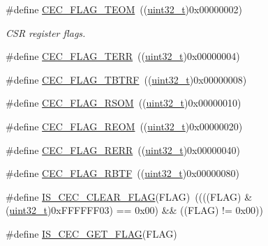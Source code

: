 \begin{DoxyCompactItemize}
\item 
\#define \hyperlink{group___c_e_c__flags__definition_gad0adfb11294f562f2c8dc555f69e25e0}{C\+E\+C\+\_\+\+F\+L\+A\+G\+\_\+\+T\+E\+OM}~((\hyperlink{_p_e___types_8h_a33594304e786b158f3fb30289278f5af}{uint32\+\_\+t})0x00000002)
\begin{DoxyCompactList}\small\item\em C\+SR register flags. \end{DoxyCompactList}\item 
\#define \hyperlink{group___c_e_c__flags__definition_ga7edc608ca7b4ea74dd4d795fa3214c11}{C\+E\+C\+\_\+\+F\+L\+A\+G\+\_\+\+T\+E\+RR}~((\hyperlink{_p_e___types_8h_a33594304e786b158f3fb30289278f5af}{uint32\+\_\+t})0x00000004)
\item 
\#define \hyperlink{group___c_e_c__flags__definition_gaeb02634fdd06f4ea0990e2cf23cf200e}{C\+E\+C\+\_\+\+F\+L\+A\+G\+\_\+\+T\+B\+T\+RF}~((\hyperlink{_p_e___types_8h_a33594304e786b158f3fb30289278f5af}{uint32\+\_\+t})0x00000008)
\item 
\#define \hyperlink{group___c_e_c__flags__definition_ga4e352d4f48e3b197edf150860703d2bf}{C\+E\+C\+\_\+\+F\+L\+A\+G\+\_\+\+R\+S\+OM}~((\hyperlink{_p_e___types_8h_a33594304e786b158f3fb30289278f5af}{uint32\+\_\+t})0x00000010)
\item 
\#define \hyperlink{group___c_e_c__flags__definition_gaffeaec4eafbf1efbd88139b9bb0654a7}{C\+E\+C\+\_\+\+F\+L\+A\+G\+\_\+\+R\+E\+OM}~((\hyperlink{_p_e___types_8h_a33594304e786b158f3fb30289278f5af}{uint32\+\_\+t})0x00000020)
\item 
\#define \hyperlink{group___c_e_c__flags__definition_gac2376c2b958536ab414574f60cb5d75a}{C\+E\+C\+\_\+\+F\+L\+A\+G\+\_\+\+R\+E\+RR}~((\hyperlink{_p_e___types_8h_a33594304e786b158f3fb30289278f5af}{uint32\+\_\+t})0x00000040)
\item 
\#define \hyperlink{group___c_e_c__flags__definition_gae73c6ec73ab8ad57b18d3bd416baf2d3}{C\+E\+C\+\_\+\+F\+L\+A\+G\+\_\+\+R\+B\+TF}~((\hyperlink{_p_e___types_8h_a33594304e786b158f3fb30289278f5af}{uint32\+\_\+t})0x00000080)
\item 
\#define \hyperlink{group___c_e_c__flags__definition_ga418911667f82a12dd097f7fac7ad4e89}{I\+S\+\_\+\+C\+E\+C\+\_\+\+C\+L\+E\+A\+R\+\_\+\+F\+L\+AG}(F\+L\+AG)~((((F\+L\+AG) \& (\hyperlink{_p_e___types_8h_a33594304e786b158f3fb30289278f5af}{uint32\+\_\+t})0x\+F\+F\+F\+F\+F\+F03) == 0x00) \&\& ((\+F\+L\+A\+G) != 0x00))
\item 
\#define \hyperlink{group___c_e_c__flags__definition_ga929b30d90f6807e9f72976596b0b850b}{I\+S\+\_\+\+C\+E\+C\+\_\+\+G\+E\+T\+\_\+\+F\+L\+AG}(F\+L\+AG)

\end{DoxyCompactItemize}
